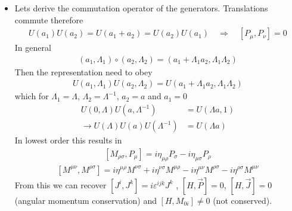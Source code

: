 \documentclass[10pt,a4paper]{book}
\theoremstyle{definition}
\begin{document}
\begin{itemize}
\item Lets derive the commutation operator of the generators. Translations commute therefore
\begin{align}
U(a_1)U(a_2)=U(a_1+a_2)=U(a_2)U(a_1)\quad\Rightarrow\quad
\boxed{[P_\mu,P_\nu]=0}
\end{align}
In general
\begin{align}
(a_1,\Lambda_1)\circ(a_2,\Lambda_2)=(a_1+\Lambda_1a_2,\Lambda_1\Lambda_2)
\end{align}
Then the representation need to obey
\begin{align}
U(a_1,\Lambda_1)U(a_2,\Lambda_2)=U(a_1+\Lambda_1a_2,\Lambda_1\Lambda_2)
\end{align}
which for $\Lambda_1=\Lambda$, $\Lambda_2=\Lambda^{-1}$, $a_2=a$ and $a_1=0$
\begin{align}
U(0,\Lambda)U(a,\Lambda^{-1})&=U(\Lambda a,1)\\
\rightarrow U(\Lambda)U(a)U(\Lambda^{-1})&=U(\Lambda a)
\end{align}
In lowest order this results in
\begin{align}
\boxed{[M_{\rho\sigma},P_\mu]=i\eta_{\mu\rho}P_\sigma-i\eta_{\mu\sigma}P_\rho }
\end{align}
\begin{align}
\boxed{[M^{\mu\nu},M^{\rho\sigma}]=i\eta^{\mu\rho}M^{\nu\sigma}+i\eta^{\nu\sigma}M^{\mu\rho}-i\eta^{\mu\nu}M^{\rho\sigma}-i\eta^{\rho\sigma}M^{\mu\nu}}
\end{align}
From this we can recover $[J^i,J^k]=i\varepsilon^{ijk}J^k$ , $[H,\vec{P}]=0$, $[H,\vec{J}]=0$ (angular momentum conservation) and $[H,M_{0i}]\neq0$ (not conserved).
\end{itemize}
\end{document}
